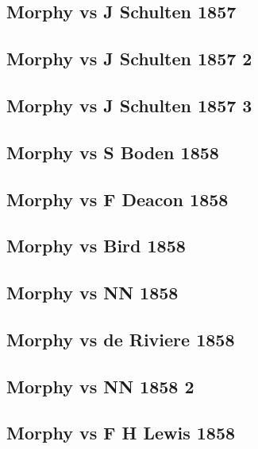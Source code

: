 \documentclass[]{book}
\begin{document}
\subsection{Morphy vs J Schulten
1857}\label{morphy-vs-j-schulten-1857-1}

\subsection{Morphy vs J Schulten 1857
2}\label{morphy-vs-j-schulten-1857-2}

\subsection{Morphy vs J Schulten 1857
3}\label{morphy-vs-j-schulten-1857-3}

\subsection{Morphy vs S Boden 1858}\label{morphy-vs-s-boden-1858}

\subsection{Morphy vs F Deacon 1858}\label{morphy-vs-f-deacon-1858}

\subsection{Morphy vs Bird 1858}\label{morphy-vs-bird-1858}

\subsection{Morphy vs NN 1858}\label{morphy-vs-nn-1858}

\subsection{Morphy vs de Riviere 1858}\label{morphy-vs-de-riviere-1858}

\subsection{Morphy vs NN 1858 2}\label{morphy-vs-nn-1858-2}

\subsection{Morphy vs F H Lewis 1858}\label{morphy-vs-f-h-lewis-1858}
\end{document}
